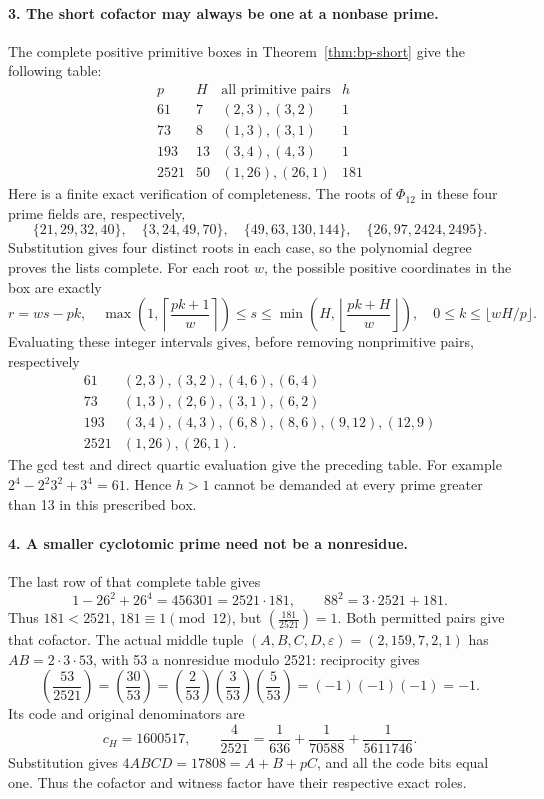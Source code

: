 \paragraph{3. The short cofactor may always be one at a nonbase prime.}
The complete positive primitive boxes in Theorem~\ref{thm:bp-short}
give the following table:
\[
\begin{array}{c|c|c|c}
 p&H&\text{all primitive pairs}&h\\\hline
 61&7&(2,3),(3,2)&1\\
 73&8&(1,3),(3,1)&1\\
 193&13&(3,4),(4,3)&1\\
 2521&50&(1,26),(26,1)&181
\end{array}
\]
Here is a finite exact verification of completeness. The roots of
\(\Phi_{12}\) in these four prime fields are, respectively,
\[
 \{21,29,32,40\},\quad \{3,24,49,70\},\quad
 \{49,63,130,144\},\quad \{26,97,2424,2495\}.
\]
Substitution gives four distinct roots in each case, so the polynomial
degree proves the lists complete. For each root \(w\), the possible
positive coordinates in the box are exactly
\[
 r=ws-pk,\quad
 \max\left(1,\left\lceil\frac{pk+1}{w}\right\rceil\right)
 \le s\le
 \min\left(H,\left\lfloor\frac{pk+H}{w}\right\rfloor\right),
 \quad0\le k\le\lfloor wH/p\rfloor.
 \tag{BP17}
\]
Evaluating these integer intervals gives, before removing nonprimitive
pairs, respectively
\[
\begin{array}{c|l}
61&(2,3),(3,2),(4,6),(6,4)\\
73&(1,3),(2,6),(3,1),(6,2)\\
193&(3,4),(4,3),(6,8),(8,6),(9,12),(12,9)\\
2521&(1,26),(26,1).
\end{array}
\]
The gcd test and direct quartic evaluation give the preceding table.
For example \(2^4-2^2 3^2+3^4=61\). Hence \(h>1\) cannot
be demanded at every prime greater than 13 in this prescribed box.

\paragraph{4. A smaller cyclotomic prime need not be a nonresidue.}
The last row of that complete table gives
\[
 1-26^2+26^4=456301=2521\cdot181,
 \qquad 88^2=3\cdot2521+181.
\]
Thus \(181<2521\), \(181\equiv1\pmod{12}\), but
\(\left(\frac{181}{2521}\right)=1\). Both permitted pairs
give that cofactor. The actual middle tuple
\((A,B,C,D,\varepsilon)=(2,159,7,2,1)\) has
\(AB=2\cdot3\cdot53\), with 53 a nonresidue modulo 2521:
reciprocity gives
\[
 \left(\frac{53}{2521}\right)
 =\left(\frac{30}{53}\right)
 =\left(\frac2{53}\right)\left(\frac3{53}\right)
  \left(\frac5{53}\right)=(-1)(-1)(-1)=-1.
\]
Its code and original denominators are
\[
 c_H=1600517,\qquad
 \frac4{2521}=\frac1{636}+\frac1{70588}+\frac1{5611746}.
\]
Substitution gives \(4ABCD=17808=A+B+pC\), and all the code
bits equal one. Thus the cofactor and witness factor have their
respective exact roles.


